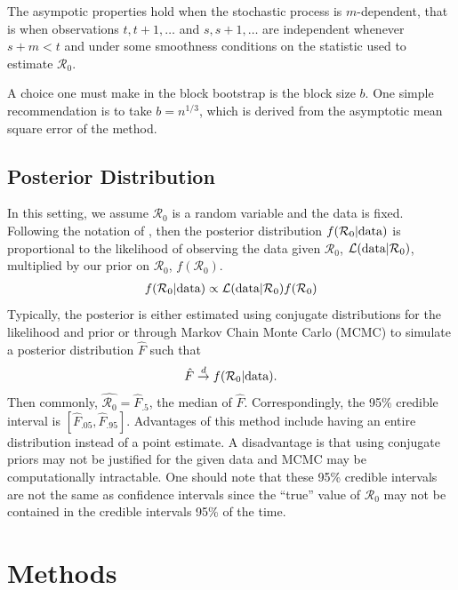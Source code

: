 \documentclass[12pt]{article}
\newcommand{\rr}{\ensuremath{\mathcal{R}_0}}
\begin{document}
The asympotic properties hold when the stochastic process is $m$-dependent, that is when observations $t, t+1, \dots$ and $s, s+1, \dots$ are independent whenever $s+m < t$ and under some smoothness conditions on the statistic used to estimate $\rr$.

A choice one must make in the block bootstrap is the block size $b$.  One simple recommendation is to take $b= n^{1/3}$, which is derived from the asymptotic mean square error of the method.


\subsection{Posterior Distribution}
In this setting, we assume $\rr$ is a random variable and the data is fixed.  Following the notation of \cite{wasserman2004}, then the posterior distribution $f(\rr | \textnormal{data})$ is proportional to the likelihood of observing the data given $\rr$, $\mathcal{L}(\textnormal{data}|\rr)$, multiplied by our prior on $\rr$, $f(\rr)$. 
\begin{align*}
f(\rr | \textnormal{data} ) \propto \mathcal{L}(\textnormal{data} | \rr) f(\rr)
\end{align*}
 Typically, the posterior is either estimated using conjugate distributions for the likelihood and prior or through Markov Chain Monte Carlo (MCMC) to simulate a posterior distribution $\hat{F}$ such that
\begin{align*}
\hat{F} \overset{d}{\to} f(\rr| \textnormal{data}).
\end{align*}
Then commonly, $\hat{\rr} = \hat{F}_{.5}$, the median of $\hat{F}$.  Correspondingly, the 95\% credible interval is $\left[\hat{F}_{.05}, \hat{F}_{.95} \right ]$. Advantages of this method include having an entire distribution instead of a point estimate.  A disadvantage is that using conjugate priors may not be justified for the given data and MCMC may be computationally intractable.  One should note that these 95\% credible intervals are not the same as confidence intervals since the ``true'' value of $\rr$ may not be contained in the credible intervals 95\% of the time.





\section{Methods}\label{sec:sim-res}
\end{document}
